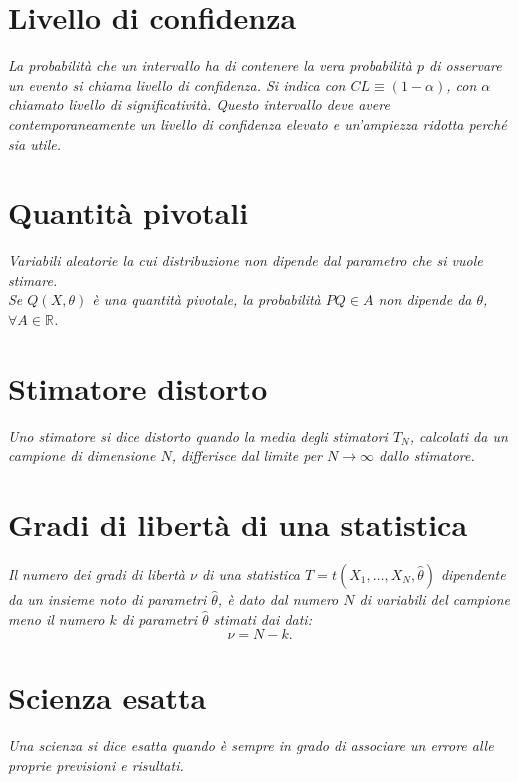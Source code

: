 \section{Livello di confidenza} %
\label{sec:livello-confidenza}
\emph{La probabilità che un intervallo ha di contenere la vera probabilità $p$ di osservare un evento si chiama livello di confidenza. Si indica con $CL\equiv (1-\alpha)$, con $\alpha$ chiamato livello di significatività. Questo intervallo deve avere contemporaneamente un livello di confidenza elevato e un'ampiezza ridotta perché sia utile.}

\section{Quantità pivotali} %
\label{sec:quantità-pivotali}
\emph{Variabili aleatorie la cui distribuzione non dipende dal parametro che si vuole stimare. \\ Se $Q(X,\theta)$ è una quantità pivotale, la probabilità $P{Q\in A}$ non dipende da $\theta$, $\forall A \in \mathbb{R}$.}

\section{Stimatore distorto} %
\label{sec:stimatore-distorto}
\emph{Uno stimatore si dice distorto quando la media degli stimatori $T_N$, calcolati da un campione di dimensione $N$, differisce dal limite per $N\rightarrow \infty$ dallo stimatore.}

\section{Gradi di libertà di una statistica} %
\label{sec:gradi-libertà}
\emph{Il numero dei gradi di libertà $\nu$ di una statistica $T=t\left( { X }_{ 1 },\dots ,{ X }_{ N },\hat { \theta  }  \right) $ dipendente da un insieme noto di parametri $\hat { \theta  } $, è dato dal numero $N$ di variabili del campione meno il numero $k$ di parametri $\hat { \theta  } $ stimati dai dati:
\begin{equation}
\nu=N-k.
\end{equation}}

\section{Scienza esatta} %
\label{sec:scienza-esatta}
\emph{Una scienza si dice esatta quando è sempre in grado di associare un errore alle proprie previsioni e risultati.}

